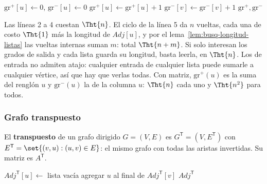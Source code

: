 \documentclass[11pt,letterpaper]{article}
\begin{document}
\begin{algorithm}[H]
\caption{\textsc{Grados}$(G)$}
\label{alg:busq-grados}
\begin{algorithmic}[1]
    \State $\text{gr}^{+}[u] \gets 0$, \quad $\text{gr}^{-}[u] \gets 0$
  \EndFor
      \State $\text{gr}^{+}[u] \gets \text{gr}^{+}[u] + 1$
      \State $\text{gr}^{-}[v] \gets \text{gr}^{-}[v] + 1$
    \EndFor
  \EndFor
  \State \Return $\text{gr}^{+}, \text{gr}^{-}$
\EndProcedure
\end{algorithmic}
\end{algorithm}

Las líneas 2 a 4 cuestan $\Tht{n}$. El ciclo de la línea 5 da $n$
vueltas, cada una de costo $\Tht{1}$ más la longitud de
$\mathit{Adj}[u]$, y por el lema~\ref{lem:busq-longitud-listas} las
vueltas internas suman $m$: total $\Tht{n + m}$. Si solo interesan los
grados de salida y cada lista guarda su longitud, basta leerla, en
$\Tht{n}$. Los de entrada no admiten atajo: cualquier entrada de
cualquier lista puede sumarle a cualquier vértice, así que hay que
verlas todas. Con matriz, $\text{gr}^{+}(u)$ es la suma del renglón $u$
y $\text{gr}^{-}(u)$ la de la columna $u$: $\Tht{n}$ cada uno y
$\Tht{n^2}$ para todos.

\subsubsection*{Grafo transpuesto}

\begin{definicion}
  El \textbf{transpuesto} de un grafo dirigido $G = (V, E)$ es
  $G^{\mathsf{T}} = (V, E^{\mathsf{T}})$ con
  $E^{\mathsf{T}} = \set{(v, u) : (u, v) \in E}$: el mismo grafo con
  todas las aristas invertidas. Su matriz es $A^{\mathsf{T}}$.
\end{definicion}

\begin{algorithm}[H]
\caption{\textsc{Transponer-Listas}$(G)$}
\label{alg:busq-transponer}
\begin{algorithmic}[1]
    \State $\mathit{Adj}^{\mathsf{T}}[u] \gets$ lista vacía
  \EndFor
      \State agregar $u$ al final de $\mathit{Adj}^{\mathsf{T}}[v]$
    \EndFor
  \EndFor
  \State \Return $\mathit{Adj}^{\mathsf{T}}$
\EndProcedure
\end{algorithmic}
\end{algorithm}
\end{document}
